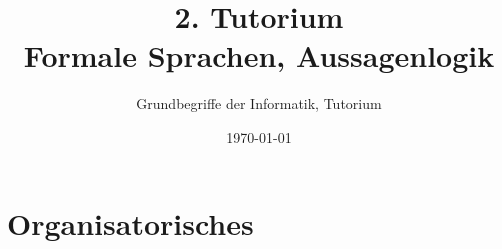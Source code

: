 




\title[Formale Sprachen, Aussagenlogik]{2. Tutorium\\ Formale Sprachen, Aussagenlogik}
\subtitle{Grundbegriffe der Informatik, Tutorium \hashtag\mytutnumber}
\date{\today}


\titleframe
\roadmap

\section{Organisatorisches}



